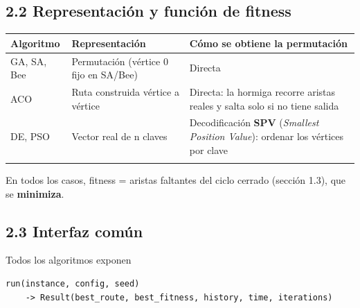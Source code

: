\documentclass[
  spanish,
  11pt,
]{article}
\newcounter{none} %
\begin{document}
\subsection{2.2 Representación y función de
fitness}\label{representaciuxf3n-y-funciuxf3n-de-fitness}

{\def\LTcaptype{none} %
\begin{center}
\begin{tabular}{@{}
  >{\raggedright\arraybackslash}p{}
  >{\raggedright\arraybackslash}p{}
  >{\raggedright\arraybackslash}p{}@{}}
\toprule\noalign{}
\begin{minipage}[b]{\linewidth}\raggedright
Algoritmo
\end{minipage} & \begin{minipage}[b]{\linewidth}\raggedright
Representación
\end{minipage} & \begin{minipage}[b]{\linewidth}\raggedright
Cómo se obtiene la permutación
\end{minipage} \\
\midrule\noalign{}
GA, SA, Bee & Permutación (vértice 0 fijo en SA/Bee) & Directa \\
ACO & Ruta construida vértice a vértice & Directa: la hormiga recorre
aristas reales y salta solo si no tiene salida \\
DE, PSO & Vector real de n claves & Decodificación \textbf{SPV}
(\emph{Smallest Position Value}): ordenar los vértices por clave \\
\bottomrule\noalign{}
\end{tabular}
\end{center}
}

En todos los casos, fitness = aristas faltantes del ciclo cerrado
(sección 1.3), que se \textbf{minimiza}.

\subsection{2.3 Interfaz común}\label{interfaz-comuxfan}

Todos los algoritmos exponen

\begin{verbatim}
run(instance, config, seed)
    -> Result(best_route, best_fitness, history, time, iterations)
\end{verbatim}
\end{document}
